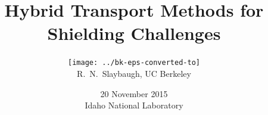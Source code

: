 \documentclass[xcolor=x11names,compress, handout]{beamer}
\renewcommand{\(}{\begin{columns}}
\renewcommand{\)}{\end{columns}}
\newcommand{\<}[1]{\begin{column}{#1}}
\renewcommand{\>}{\end{column}}
\begin{document}
\begin{frame}
\title{Hybrid Transport Methods for Shielding Challenges}
\author{\texttt{[image: ../bk-eps-converted-to]}\\\vspace*{1em}R.\ N.\ Slaybaugh, UC Berkeley}%
\date{20 November 2015 \\ Idaho National Laboratory}
\titlepage
\end{frame}


\end{document}
